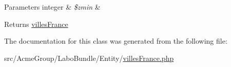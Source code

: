 \begin{DoxyParams}[1]{Parameters}
integer & {\em \$zmin} & \\
\hline
\end{DoxyParams}
\begin{DoxyReturn}{Returns}
\hyperlink{class_acme_group_1_1_labo_bundle_1_1_entity_1_1villes_france}{villes\+France} 
\end{DoxyReturn}


The documentation for this class was generated from the following file\+:\begin{DoxyCompactItemize}
\item 
src/\+Acme\+Group/\+Labo\+Bundle/\+Entity/\hyperlink{villes_france_8php}{villes\+France.\+php}\end{DoxyCompactItemize}

